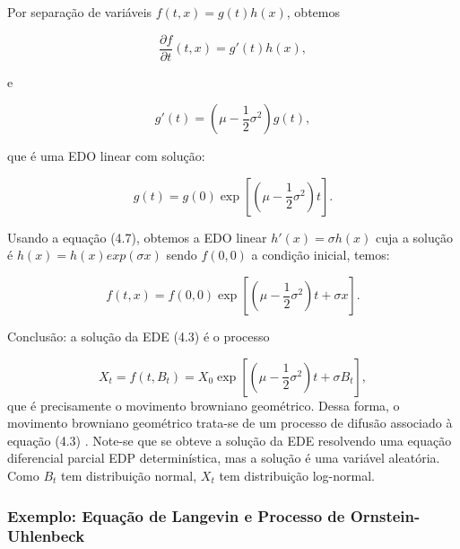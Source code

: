 \documentclass[12pt,openright,oneside,a4paper]{abntex2}
\numberwithin{equation}{section}
\begin{document}
Por separação de variáveis $f(t, x) = g(t) h(x)$, obtemos

\[
\frac{\partial f}{\partial t} (t, x) = g'(t) h(x),
\]

e

\[
g'(t) = \left( \mu - \frac{1}{2} \sigma^2 \right) g(t),
\]

que é uma EDO linear com solução:

\[
g(t) = g(0) \exp \left[ \left( \mu - \frac{1}{2} \sigma^2 \right) t \right].
\]

Usando a equação (4.7), obtemos a EDO linear $h'(x) = \sigma h(x)$ cuja a solução é $h (x) = h(x)exp(\sigma x)$ sendo $f(0,0)$ a condição inicial, temos:

\[
f(t, x) = f(0,0) \exp \left[ \left( \mu - \frac{1}{2} \sigma^2 \right) t + \sigma x \right].
\]

Conclusão: a solução da EDE (4.3) é o processo

\begin{equation}
X_t = f (t, B_t) = X_0 \exp \left[ \left( \mu - \frac{1}{2} \sigma^2 \right) t + \sigma B_t \right],
\label{eq:mbg}
\end{equation}
que é precisamente o movimento browniano geométrico. Dessa forma, o movimento browniano geométrico trata-se de um processo de difusão associado à equação (4.3) \parencite [p.~140] {Mikosh}. Note-se que se obteve a solução da EDE resolvendo uma equação diferencial parcial EDP determinística, mas a solução é uma variável aleatória. Como $B_t$ tem distribuição normal, $X_t$ tem distribuição log-normal.







\subsubsection{Exemplo: Equação de Langevin e Processo de Ornstein-Uhlenbeck}
\end{document}
